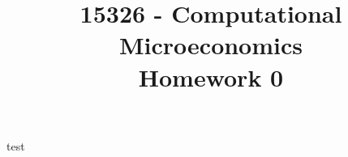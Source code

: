 \documentclass{article}
\title{15326 - Computational Microeconomics\\
Homework 0}
\begin{document}
test
\end{document}
